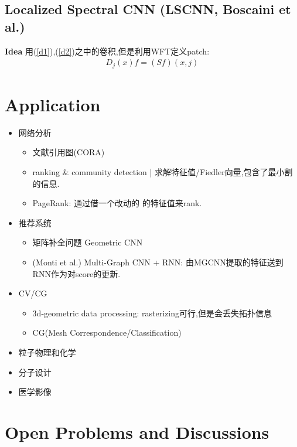 \documentclass{article}
\begin{document}
\subsection{Localized Spectral CNN (LSCNN, Boscaini et al.)}

\textbf{Idea} 用(\ref{d1}),(\ref{d2})之中的卷积,但是利用WFT定义patch:
\begin{align}
    D_j(x)f = (Sf)(x,j)
\end{align}

\section{Application}

\begin{itemize}
    \item 网络分析
    \begin{itemize}
        \item 文献引用图(CORA)
        \item ranking \& community detection | 求解特征值/Fiedler向量,包含了最小割的信息. 
        \item PageRank: 通过借一个改动的 \lop 的特征值来rank.
    \end{itemize}
    \item 推荐系统
    \begin{itemize}
        \item 矩阵补全问题 \tRarr Geometric CNN
        \item (Monti et al.) Multi-Graph CNN + RNN: 由MGCNN提取的特征送到RNN作为对score的更新.
    \end{itemize}
    \item CV/CG
    \begin{itemize}
        \item 3d-geometric data processing: rasterizing可行,但是会丢失拓扑信息
        \item CG(Mesh Correspondence/Classification)
    \end{itemize}
    \item 粒子物理和化学
    \item 分子设计
    \item 医学影像
\end{itemize}

\section{Open Problems and Discussions}
\end{document}
